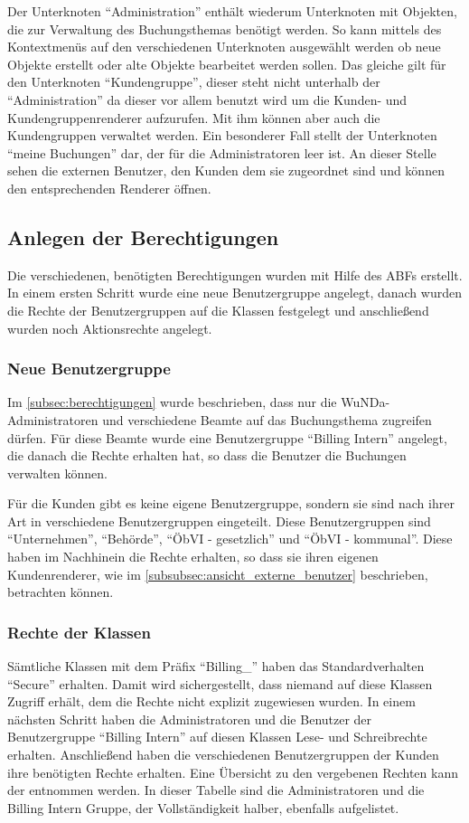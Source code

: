 Der Unterknoten "`Administration"' enthält wiederum Unterknoten mit Objekten, die zur Verwaltung des Buchungsthemas benötigt werden.
So kann mittels des Kontextmenüs auf den verschiedenen Unterknoten ausgewählt werden ob neue Objekte erstellt oder alte Objekte bearbeitet werden sollen.
Das gleiche gilt für den Unterknoten "`Kundengruppe"', dieser steht nicht unterhalb der "`Administration"' da dieser vor allem benutzt wird um die Kunden- und Kundengruppenrenderer aufzurufen. Mit ihm können aber auch die Kundengruppen verwaltet werden.
Ein besonderer Fall stellt der Unterknoten "`meine Buchungen"' dar, der für die Administratoren leer ist.
An dieser Stelle sehen die externen Benutzer, den Kunden dem sie zugeordnet sind und können den entsprechenden Renderer öffnen. 

\subsection{Anlegen der Berechtigungen}

Die verschiedenen, benötigten Berechtigungen wurden mit Hilfe des \ac{ABF}s erstellt.
In einem ersten Schritt wurde eine neue Benutzergruppe angelegt, danach wurden die Rechte der Benutzergruppen auf die Klassen festgelegt und anschließend wurden noch Aktionsrechte angelegt. 

\subsubsection{Neue Benutzergruppe}
Im \autoref{subsec:berechtigungen} wurde beschrieben, dass nur die \ac{WuNDa}-Administratoren und verschiedene Beamte auf das Buchungsthema zugreifen dürfen.
Für diese Beamte wurde eine Benutzergruppe "`Billing Intern"' angelegt, die danach die Rechte erhalten hat, so dass die Benutzer die Buchungen verwalten können.

Für die Kunden gibt es keine eigene Benutzergruppe, sondern sie sind nach ihrer Art in verschiedene Benutzergruppen eingeteilt.
Diese Benutzergruppen sind "`Unternehmen"', "`Behörde"', "`ÖbVI - gesetzlich"' und "`ÖbVI - kommunal"'.
Diese haben im Nachhinein die Rechte erhalten, so dass sie ihren eigenen Kundenrenderer, wie im \autoref{subsubsec:ansicht_externe_benutzer} beschrieben, betrachten können.

\subsubsection{Rechte der Klassen}
Sämtliche Klassen mit dem Präfix "`Billing\_"' haben das Standardverhalten "`Secure"' erhalten. Damit wird sichergestellt, dass niemand auf diese Klassen Zugriff erhält, dem die Rechte nicht explizit zugewiesen wurden.
In einem nächsten Schritt haben die Administratoren und die Benutzer der Benutzergruppe "`Billing Intern"' auf diesen Klassen Lese- und Schreibrechte erhalten.
Anschließend haben die verschiedenen Benutzergruppen der Kunden ihre benötigten Rechte erhalten.
Eine Übersicht zu den vergebenen Rechten kann der  entnommen werden.
In dieser Tabelle sind die Administratoren und die Billing Intern Gruppe, der Vollständigkeit halber, ebenfalls aufgelistet.

